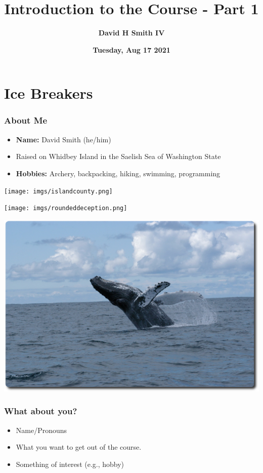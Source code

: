 \documentclass{beamer}
\title{\textbf{Introduction to the Course - Part 1}}
\author{\textbf{David H Smith IV}}
\institute[\textbf{UIUC}]{\textbf{University of Illinois Urbana-Champaign}}
\date{\textbf{Tuesday, Aug 17 2021}}
\begin{document}
\frame{\titlepage}

\section{Ice Breakers}

\begin{frame}
  \frametitle{About Me}
  \begin{minipage}{0.39\textwidth}
    \begin{itemize}
      \item \textbf{Name: }David Smith (he/him)
      \item Raised on Whidbey Island in the Saelish Sea of Washington State
      \item \textbf{Hobbies: } Archery, backpacking, hiking, swimming, programming
    \end{itemize}
  \end{minipage}
  \begin{minipage}{0.59\textwidth}
    \centering
    \texttt{[image: imgs/islandcounty.png]}
    \vfill
    \begin{minipage}{0.49\textwidth}
      \texttt{[image: imgs/roundeddeception.png]}
    \end{minipage}
    \begin{minipage}{0.49\textwidth}
      \includegraphics[width=\textwidth]{imgs/roundedgreywhale.pdf}
    \end{minipage}
  \end{minipage}
\end{frame}

\begin{frame}
  \frametitle{What about you?}
  \begin{itemize}
    \item Name/Pronouns
    \item What you want to get out of the course.
    \item Something of interest (e.g., hobby)
  \end{itemize}
\end{frame}
\end{document}
